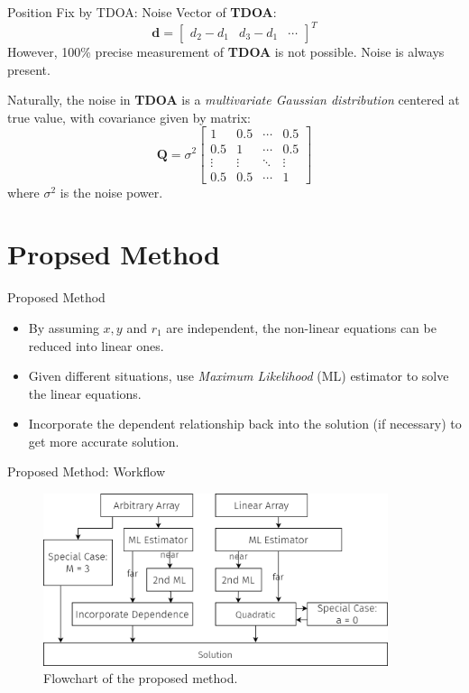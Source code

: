 \documentclass[10pt]{beamer}
\begin{document}
\begin{frame}{Position Fix by TDOA: Noise}
  Vector of \textbf{TDOA}:
    $$\mathbf{d} = \begin{bmatrix} d_2-d_1 & d_3-d_1 & \cdots \end{bmatrix}^{T}$$
  However, 100\% precise measurement of \textbf{TDOA} is not possible.
  Noise is always present.

  Naturally, the noise in \textbf{TDOA} is a \textit{multivariate Gaussian distribution}
  centered at true value, with covariance given by matrix:
    $$ \mathbf{Q} = \sigma^2
      \begin{bmatrix}
        1 & 0.5 & \cdots & 0.5 \\
        0.5 & 1 & \cdots & 0.5 \\
        \vdots & \vdots & \ddots & \vdots \\
        0.5 & 0.5 & \cdots & 1 \end{bmatrix}
    $$
    where $\sigma^2$ is the noise power.
\end{frame}

\section{Propsed Method}

\begin{frame}{Proposed Method}
  \begin{itemize}[<+- | alert@+>]
    \item By assuming $x, y$ and $r_1$ are independent, the non-linear
          equations can be reduced into linear ones.

    \item Given different situations, use \emph{Maximum Likelihood} (ML)
          estimator to solve the linear equations.

    \item Incorporate the dependent relationship back into the solution (if necessary)
          to get more accurate solution.

  \end{itemize}
\end{frame}

\begin{frame}{Proposed Method: Workflow}

  \begin{figure}
    \centering
    \includegraphics[width=0.9\textwidth]{proposed-workflow.png}
    \caption{Flowchart of the proposed method.}
  \end{figure}
\end{frame}
\end{document}
